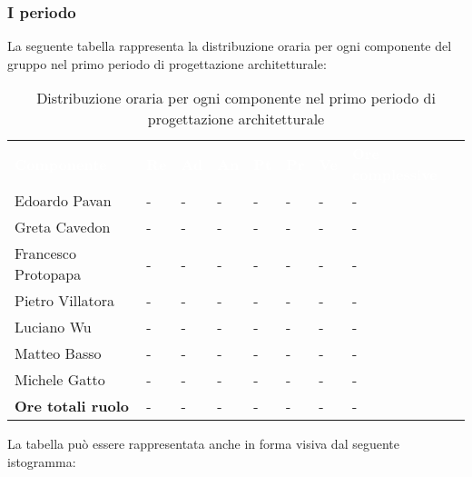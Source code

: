 \subsubsection{I periodo}
La seguente tabella rappresenta la distribuzione oraria per ogni componente del gruppo nel primo periodo di progettazione architetturale:
\begin{table}[!htbp]
\begin{center}
\renewcommand{\arraystretch}{1.25}
\begin{tabular}{ m{}<{\centering}  m{}<{\centering} m{}<{\centering} m{}<{\centering}  m{}<{\centering}  m{}<{\centering}  m{}<{\centering}  m{}<{\centering}   }
	\rowcolor{darkblue}
	\textcolor{white}{\textbf{Componente}} &\textcolor{white}{\textbf{Re}}&\textcolor{white}{\textbf{Ad}}&\textcolor{white}{\textbf{An}}&\textcolor{white}{\textbf{Pt}}&\textcolor{white}{\textbf{Pr}}&\textcolor{white}{\textbf{Ve}}&\textcolor{white}{\textbf{Ore complessive}}\\ 

	Edoardo Pavan & - & - & - & - & - & - & -\\	

	Greta Cavedon & - & - & - & - & - & - & -\\
	
	Francesco Protopapa & - & - & - & - & - & - & -\\
	
	Pietro Villatora & - & - & - & - & - & - & -\\
	
	Luciano Wu & - & - & - & - & - & - & -\\
	
	Matteo Basso & - & - & - & - & - & - & -\\
	
	Michele Gatto & - & - & - & - & - & - & -\\
	
	\textbf{Ore totali ruolo} & - & - & - & - & - & - & -\\

\end{tabular}
\caption{Distribuzione oraria per ogni componente nel primo periodo di progettazione architetturale}
\end{center}
\end{table}

La tabella può essere rappresentata anche in forma visiva dal seguente istogramma:

